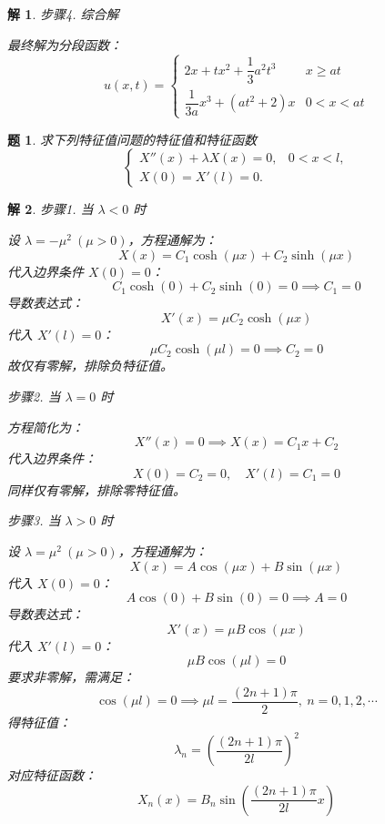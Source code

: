 \documentclass[12pt,a4paper]{article}
\newtheorem{problem}{题}
\newtheorem*{solution}{解}
\begin{document}
\begin{solution}
	步骤4. 综合解
			
		\noindent
		最终解为分段函数：
		\[
		u(x,t) = 
		\begin{cases}
			2x + tx^2 + \dfrac{1}{3}a^2t^3 & x \geq at \\
			\dfrac{1}{3a}x^3 + (at^2  + 2)x & 0 < x < at
		\end{cases}
		\]
	\end{solution}








\newpage
\begin{problem}
	求下列特征值问题的特征值和特征函数
	\[
	\begin{cases}
		X''(x) + \lambda X(x) = 0, & 0 < x < l, \\
		X(0) = X'(l) = 0.
	\end{cases}
	\]
\end{problem}

\begin{solution}
	步骤1. 当 \(\lambda < 0\) 时
		
	\noindent
	设 \(\lambda = -\mu^2\ (\mu > 0)\)，方程通解为：
	\[
	X(x) = C_1 \cosh(\mu x) + C_2 \sinh(\mu x)
	\]
	代入边界条件 \(X(0)=0\)：
	\[
	C_1 \cosh(0) + C_2 \sinh(0) = 0 \implies C_1 = 0
	\]
	导数表达式：
	\[
	X'(x) = \mu C_2 \cosh(\mu x)
	\]
	代入 \(X'(l)=0\)：
	\[
	\mu C_2 \cosh(\mu l) = 0 \implies C_2 = 0
	\]
	故仅有零解，排除负特征值。
	
	步骤2. 当 \(\lambda = 0\) 时
		
	\noindent
	方程简化为：
	\[
	X''(x) = 0 \implies X(x) = C_1 x + C_2
	\]
	代入边界条件：
	\[
	X(0) = C_2 = 0,\quad X'(l) = C_1 = 0
	\]
	同样仅有零解，排除零特征值。
	
	步骤3. 当 \(\lambda > 0\) 时
		
	\noindent
	设 \(\lambda = \mu^2\ (\mu > 0)\)，方程通解为：
	\[
	X(x) = A \cos(\mu x) + B \sin(\mu x)
	\]
	代入 \(X(0)=0\)：
	\[
	A \cos(0) + B \sin(0) = 0 \implies A = 0
	\]
	导数表达式：
	\[
	X'(x) = \mu B \cos(\mu x)
	\]
	代入 \(X'(l)=0\)：
	\[
	\mu B \cos(\mu l) = 0
	\]
	要求非零解，需满足：
	\[
	\cos(\mu l) = 0 \implies \mu l = \frac{(2n+1)\pi}{2},\ n=0,1,2,\cdots
	\]
	得特征值：
	\[
	\lambda_n = \left( \frac{(2n+1)\pi}{2l} \right)^2
	\]
	对应特征函数：
	\[
	X_n(x) = B_n \sin\left( \frac{(2n+1)\pi}{2l} x \right)
	\]
	
	

\end{solution}
\end{document}
